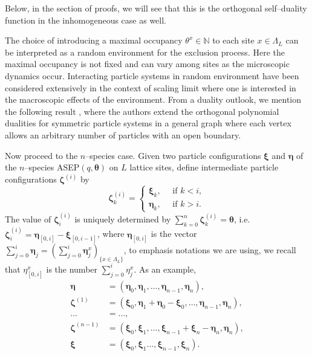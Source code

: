\documentclass{ximera}
\begin{document}
 Below, in the section of proofs, we will see that this is the orthogonal self--duality function in the inhomogeneous case as well.
\begin{remark}

The choice of introducing a maximal occupancy $\theta^x \in \mathbb{N}$ to each site $x \in \Lambda_L$ can be interpreted as a random environment for the exclusion process. Here the maximal occupancy is not fixed and can vary among sites as the microscopic dynamics occur.  
Interacting particle systems in random environment have been considered extensively in the context of scaling limit where one is interested in the macroscopic effects of the environment. From a duality outlook, we mention the following result \cite{FRS}, where the authors extend the orthogonal polynomial dualities for symmetric particle systems in a general graph where each vertex allows an arbitrary number of particles with an open boundary.
\end{remark} 
\noindent
Now proceed to the $n$--species case. Given two particle configurations $\boldsymbol\xi$ and $\boldsymbol\eta$ of the $n$--species ASEP$(q,\boldsymbol\theta)$ on $L$ lattice sites, define intermediate particle configurations $\boldsymbol\zeta^{(i)}$ by 
$$
\boldsymbol\zeta^{(i)}_k =
\begin{cases}
\boldsymbol\xi_{k}, \quad \text{ if } k<i, \\
\boldsymbol\eta_{k}, \quad \text{ if } k>i.
\end{cases}
$$
The value of $\boldsymbol\zeta^{(i)}_i$ is uniquely determined by $\sum_{k=0}^n \boldsymbol\zeta^{(i)}_k  = \boldsymbol\theta$, i.e. $\boldsymbol\zeta^{(i)}_i=\boldsymbol\eta_{[0,i]}-\boldsymbol\xi_{[0,i-1]} $, where $\boldsymbol\eta_{[0,i]}$ is the vector $\sum_{j=0}^i\boldsymbol\eta_j=(\sum_{j=0}^i\boldsymbol\eta_j^x)_{\{x\in  \Lambda_L\}}$, to emphasis notations we are using, we recall that $\eta_{[0,i]}^x$ is the number $\sum_{j=0}^i\eta_j^x$.
\newline
As an example,
\begin{align*}
  \boldsymbol\eta &= (\boldsymbol\eta_{0}, \boldsymbol\eta_1, \ldots, \boldsymbol\eta_{n-1}, \boldsymbol\eta_{n}),\\
\boldsymbol\zeta^{(1)} &= (\boldsymbol\xi_{0}, \boldsymbol\eta_1+\boldsymbol\eta_0-\boldsymbol\xi_0, \ldots, \boldsymbol\eta_{n-1}, \boldsymbol\eta_{n}),\\
\ldots &= \ldots,
\\\boldsymbol\zeta^{(n-1)} &= (\boldsymbol\xi_{0}, \boldsymbol\xi_{1},\ldots,  \boldsymbol\xi_{n-1}+\boldsymbol\xi_{n}-\boldsymbol\eta_{n}, \boldsymbol\eta_{n}),
\\
  \boldsymbol\xi &= (\boldsymbol\xi_0, \boldsymbol\xi_1 \ldots, \boldsymbol\xi_{n-1},\boldsymbol\xi_{n}).
\end{align*}
\end{document}
